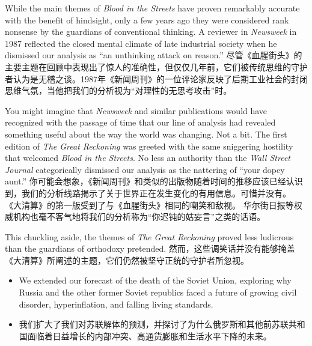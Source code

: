\begin{Parallel}{97mm}{45mm}

  \ParallelLText
  {While the main themes of \emph{Blood in the Streets} have proven remarkably accurate with the benefit of hindsight, only a few years ago they were considered rank nonsense by the guardians of conventional thinking. A reviewer in \emph{Newsweek} in 1987 reflected the closed mental climate of late industrial society when he dismissed our analysis as “an unthinking attack on reason.”}  
  \ParallelRText
  {\small 尽管《血腥街头》的主要主题在回顾中表现出了惊人的准确性，但仅仅几年前，它们被传统思维的守护者认为是无稽之谈。1987年《新闻周刊》的一位评论家反映了后期工业社会的封闭思维气氛，当他把我们的分析视为“对理性的无思考攻击”时。}
  \ParallelPar


  \ParallelLText
  {You might imagine that \emph{Newsweek} and similar publications would have recognized with the passage of time that our line of analysis had revealed something useful about the way the world was changing. Not a bit. The first edition of \emph{The Great Reckoning} was greeted with the same sniggering hostility that welcomed \emph{Blood in the Streets}. No less an authority than the \emph{Wall Street Journal} categorically dismissed our analysis as the nattering of “your dopey aunt.”  }  
  \ParallelRText
  {\small 你可能会想象，《新闻周刊》和类似的出版物随着时间的推移应该已经认识到，我们的分析线路揭示了关于世界正在发生变化的有用信息。可惜并没有。 《大清算》的第一版受到了与《血腥街头》相同的嘲笑和敌视。 华尔街日报等权威机构也毫不客气地将我们的分析称为“你迟钝的姑妄言”之类的话语。}
  \ParallelPar


  \ParallelLText
  {This chuckling aside, the themes of \emph{The Great Reckoning} proved less ludicrous than the guardians of orthodoxy pretended.   }  
  \ParallelRText
  {\small 然而，这些调笑话并没有能够掩盖《大清算》所阐述的主题，它们仍然被坚守正统的守护者所忽视。}
  \ParallelPar

\end{Parallel}

\begin{itemize}
\item We extended our forecast of the death of the Soviet Union, exploring why Russia and the other former Soviet republics faced a future of growing civil disorder, hyperinflation, and falling living standards. 
\item \small 我们扩大了我们对苏联解体的预测，并探讨了为什么俄罗斯和其他前苏联共和国面临着日益增长的内部冲突、高通货膨胀和生活水平下降的未来。
\end{itemize}


